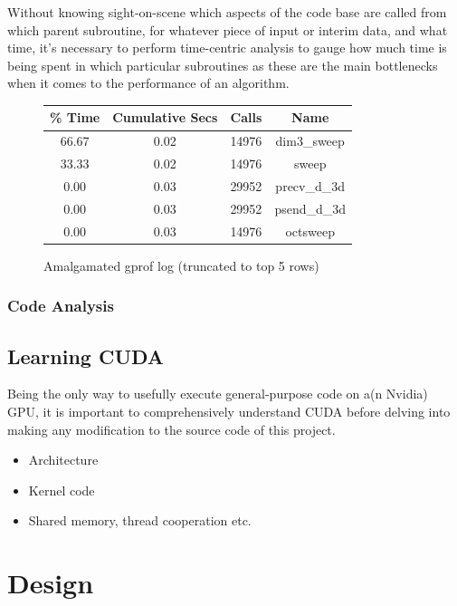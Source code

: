\documentclass[conference]{IEEEtran}
\begin{document}
Without knowing sight-on-scene which aspects of the code base are called from which parent subroutine, for whatever piece of input or interim data, and what time, it's necessary to perform time-centric analysis to gauge how much time is being spent in which particular subroutines as these are the main bottlenecks when it comes to the performance of an algorithm.



\begin{figure}[h]
    \centering
    \begin{tabular}{ | c | c | c | c | }
\hline
\% Time & Cumulative Secs & Calls & Name \\
\hline
66.67 & 0.02 & 14976 & dim3\_sweep \\
33.33 & 0.02 & 14976 & sweep \\
0.00  & 0.03 & 29952 & precv\_d\_3d \\
0.00  & 0.03 & 29952 & psend\_d\_3d \\
0.00  & 0.03 & 14976 & octsweep \\
\hline
    \end{tabular}
    \caption{Amalgamated gprof log (truncated to top 5 rows)}
    \label{table:gprof_log}
\end{figure}


\subsubsection{Code Analysis}

\subsection{Learning CUDA}

Being the only way to usefully execute general-purpose code on a(n Nvidia) GPU, it is important to comprehensively understand CUDA before delving into making any modification to the source code of this project.



\begin{itemize}
    \item Architecture
    \item Kernel code
    \item Shared memory, thread cooperation etc.
\end{itemize}


\section{Design}
\label{sec:design}
\end{document}
